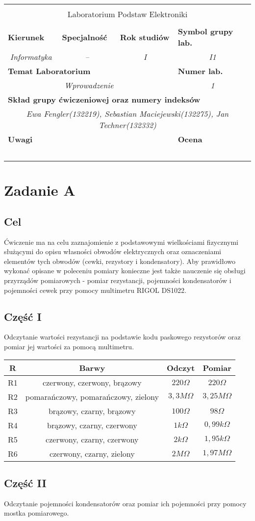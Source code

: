 \documentclass[polish,a4paper]{article}
\newcommand{\PRzFieldDsc}[1]{\sffamily\bfseries\scriptsize #1}
\newcommand{\PRzFieldCnt}[1]{\itshape #1}
\newcommand{\PRzHeading}[8]{

\begin{center}
\begin{tabular}{ p{0.32\textwidth} p{0.15\textwidth} p{0.15\textwidth} p{0.12\textwidth} p{0.12\textwidth} }

  &   &   &   &   \\
\hline
\multicolumn{5}{|c|}{}\\[-1ex]
\multicolumn{5}{|c|}{{\LARGE #1}}\\
\multicolumn{5}{|c|}{}\\[-1ex]

\hline
\multicolumn{1}{|l|}{\PRzFieldDsc{Kierunek}}	& \multicolumn{1}{|l|}{\PRzFieldDsc{Specjalność}}	& \multicolumn{1}{|l|}{\PRzFieldDsc{Rok studiów}}	& \multicolumn{2}{|l|}{\PRzFieldDsc{Symbol grupy lab.}} \\
\multicolumn{1}{|c|}{\PRzFieldCnt{#2}}		& \multicolumn{1}{|c|}{\PRzFieldCnt{#3}}		& \multicolumn{1}{|c|}{\PRzFieldCnt{#4}}		& \multicolumn{2}{|c|}{\PRzFieldCnt{#5}} \\

\hline
\multicolumn{4}{|l|}{\PRzFieldDsc{Temat Laboratorium}}		& \multicolumn{1}{|l|}{\PRzFieldDsc{Numer lab.}} \\
\multicolumn{4}{|c|}{\PRzFieldCnt{#6}}				& \multicolumn{1}{|c|}{\PRzFieldCnt{#7}} \\

\hline
\multicolumn{5}{|l|}{\PRzFieldDsc{Skład grupy ćwiczeniowej oraz numery indeksów}}\\
\multicolumn{5}{|c|}{\PRzFieldCnt{#8}}\\

\hline
\multicolumn{3}{|l|}{\PRzFieldDsc{Uwagi}}	& \multicolumn{2}{|l|}{\PRzFieldDsc{Ocena}} \\
\multicolumn{3}{|c|}{\PRzFieldCnt{\ }}		& \multicolumn{2}{|c|}{\PRzFieldCnt{\ }} \\

\hline
\end{tabular}
\end{center}
}
\begin{document}
\PRzHeading{Laboratorium Podstaw Elektroniki}{Informatyka}{--}{I}{I1}{Wprowadzenie}{1}{Ewa Fengler(132219), Sebastian Maciejewski(132275), Jan Techner(132332)}{}


\section{Zadanie A}

\subsection*{Cel}

Ćwiczenie ma na celu zaznajomienie z podstawowymi wielkościami fizycznymi służącymi do opisu własności obwodów elektrycznych oraz oznaczeniami elementów tych obwodów (cewki, rezystory i kondensatory). Aby prawidłowo wykonać opisane w poleceniu pomiary konieczne jest także nauczenie się obsługi przyrządów pomiarowych - pomiar rezystancji, pojemności kondensatorów i pojemności cewek przy pomocy multimetru RIGOL DS1022.

\subsection{Część I}
Odczytanie wartości rezystancji na podstawie kodu paskowego rezystorów oraz pomiar jej wartości za pomocą multimetru.\\

\begin{center}
\begin{tabular}{|c|c|c|c|}
\hline
\textbf{R} & \textbf{Barwy} & \textbf{Odczyt} & \textbf{Pomiar}\\
\hline
R1 & czerwony, czerwony, brązowy & $220\Omega$ & $220\Omega$\\
\hline
R2 & pomarańczowy, pomarańczowy, zielony & $3,3M\Omega$ & $3,25M\Omega$\\
\hline
R3 & brązowy, czarny, brązowy & $100\Omega$ & $98\Omega$\\
\hline
R4 & brązowy, czarny, czerwony & $1k\Omega$ & $0,99k\Omega$\\
\hline
R5 & czerwony, czarny, czerwony & $2k\Omega$ & $1,95k\Omega$\\
\hline
R6 & czerwony, czarny, zielony & $2M\Omega$ & $1,97M\Omega$\\
\hline
\end{tabular}
\end{center}

\subsection{Część II}
Odczytanie pojemności kondensatorów oraz pomiar ich pojemności przy pomocy mostka pomiarowego.\\
\end{document}
